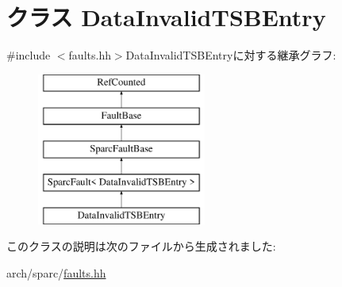 \hypertarget{classSparcISA_1_1DataInvalidTSBEntry}{
\section{クラス DataInvalidTSBEntry}
\label{classSparcISA_1_1DataInvalidTSBEntry}
}


{\ttfamily \#include $<$faults.hh$>$}DataInvalidTSBEntryに対する継承グラフ:\begin{figure}[H]
\begin{center}
\leavevmode
\includegraphics[height=5cm]{classSparcISA_1_1DataInvalidTSBEntry}
\end{center}
\end{figure}


このクラスの説明は次のファイルから生成されました:\begin{DoxyCompactItemize}
\item 
arch/sparc/\hyperlink{arch_2sparc_2faults_8hh}{faults.hh}\end{DoxyCompactItemize}
